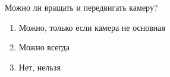 
Можно ли вращать и передвигать камеру?

\begin{enumerate}
    \item Можно, только если камера не основная
    \item Можно всегда
    \item Нет, нельзя
\end{enumerate}

